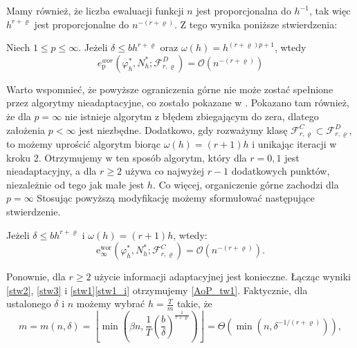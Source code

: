 \documentclass[oik, pdftex, robocza, man]{mgrwms}
\begin{document}
Mamy również, że liczba ewaluacji funkcji $n$ jest proporcjonalna do $h^{-1}$, tak więc $h^{r+\varrho}$ jest proporcjonalne do $n^{-(r+\varrho)}$. Z tego wynika poniższe stwierdzenia:
\begin{stw}
    \label{stw2}
    Niech $1 \leq p \leq \infty$. Jeżeli $\delta \leq bh^{r+\varrho}$ oraz $\omega(h) = h^{(r+\varrho)p + 1}$, wtedy
    \begin{equation*}
        e_{\mathrm{p}}^{wor}\left(\varphi_{h}^{*}, N_{h}^{*} ; \mathcal{F}_{r, \varrho}^{D}\right)=\mathcal{O}\left(n^{-(r+\varrho)}\right)
    \end{equation*}
\end{stw}

Warto wspomnieć, że powyższe ograniczenia górne nie może zostać spełnione przez algorytmy nieadaptacyjne, co zostało pokazane w \cite{PoA}. Pokazano tam również, że dla $p=\infty$ nie istnieje algorytm z błędem zbiegającym do zera, dlatego założenia $p < \infty$ jest niezbędne. Dodatkowo, gdy rozważymy klasę $\mathcal{F}_{r, \varrho}^{C} \subset \mathcal{F}_{r, \varrho}^{D}$, to możemy uprościć algorytm biorąc $\omega(h) = (r+1)h$ i unikając iteracji w kroku 2. Otrzymujemy w ten sposób algorytm, który dla $r=0,1$ jest nieadaptacyjny, a dla $r \geq 2$ używa co najwyżej $r-1$ dodatkowych punktów, niezależnie od tego jak małe jest $h$. Co więcej, organiczenie górne zachodzi dla $p = \infty$
Stosując powyższą modyfikację możemy sformułować następujące stwierdzenie.

\begin{stw}
    \label{stw3}
    Jeżeli $\delta \leq bh^{r+\varrho}$ i $\omega(h) = (r+1)h$, wtedy:
    \begin{equation}
        \mathrm{e}_{\infty}^{\mathrm{wor}}\left(\varphi_{h}^{*}, N_{h}^{*} ; \mathcal{F}_{r, \varrho}^{C}\right)=\mathcal{O}\left(n^{-(r+\varrho)}\right) .
    \end{equation}
\end{stw}

Ponownie, dla $r \geq 2$ użycie informacji adaptacyjnej jest konieczne. Łącząc wyniki \ref{stw2}, \ref{stw3} i \ref{stw1}\ref{stw1_i} otrzymujemy \ref{AoP_tw1}.
Faktycznie, dla ustalonego $\delta$ i $n$ możemy wybrać $h = \frac{T}{m}$ takie, że
\begin{equation}
    m = m(n, \delta)=\left\lfloor\min \left(\beta n, \frac{1}{T}\left(\frac{b}{\delta}\right)^{\frac{1}{r+\varrho}}\right)\right\rfloor=\varTheta\left(\min \left(n, \delta^{-1 /(r+\varrho)}\right)\right),
\end{equation}
\end{document}
